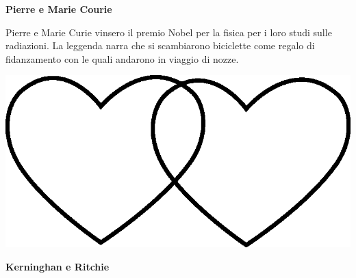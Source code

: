\documentclass[11pt]{extarticle}
\begin{document}
\begin{center}
\vspace*{\fill}
{\Huge \textbf{Pierre e Marie Courie\\}}
\vspace*{\fill}
\end{center}
\newpage
{}
\vspace*{\fill}
\begin{center}
Pierre e Marie Curie vinsero il premio Nobel per la fisica per i loro studi sulle radiazioni. La leggenda narra che si scambiarono biciclette come regalo di fidanzamento con le quali andarono in viaggio di nozze.\\
\begin{center}
\includegraphics[scale=0.1]{img/cuori_venn.eps}\\
\end{center}
\end{center}
\vspace*{\fill}
\newpage
\begin{center}
\vspace*{\fill}
{\Huge \textbf{Kerninghan e Ritchie\\}}
\vspace*{\fill}
\end{center}
\newpage
{}
\vspace*{\fill}
\end{document}
